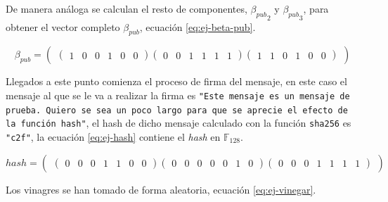 De manera análoga se calculan el resto de componentes, ${\beta_{pub}}_2$ y ${\beta_{pub}}_3$, para obtener el vector completo $\beta_{pub}$, ecuación \ref{eq:ej-beta-pub}.

\begin{equation}\label{eq:ej-beta-pub}
{\beta_{pub}} = 
	\left(\begin{matrix}
		\left(\begin{smallmatrix}
			1 & 0 & 0 & 1 & 0 & 0
		\end{smallmatrix}\right)
	
		\left(\begin{smallmatrix}
			0 & 0 & 1 & 1 & 1 & 1
		\end{smallmatrix}\right)
	
		\left(\begin{smallmatrix}
			1 & 1 & 0 & 1 & 0 & 0
		\end{smallmatrix}\right)
	\end{matrix}\right)
\end{equation}

Llegados a este punto comienza el proceso de firma del mensaje, en este caso el mensaje al que se le va a realizar la firma es \texttt{"{}Este mensaje es un mensaje de prueba. Quiero se sea un poco largo para que se aprecie el efecto de la función hash"{}}, el hash de dicho mensaje calculado con la función \texttt{sha256} es \texttt{"{}c2f"{}}, la ecuación \ref{eq:ej-hash} contiene el \textit{hash} en $\mathds{F}_{128}$.

\begin{equation}\label{eq:ej-hash}
	{hash} = 
	\left(\begin{matrix}
		\left(\begin{smallmatrix}
			0 & 0 & 0 & 1 & 1 & 0 & 0
		\end{smallmatrix}\right)
		
		\left(\begin{smallmatrix}
			0 & 0 & 0 & 0 & 0 & 1 & 0
		\end{smallmatrix}\right)
		
		\left(\begin{smallmatrix}
			0 & 0 & 0 & 1 & 1 & 1 & 1
		\end{smallmatrix}\right)
	\end{matrix}\right)
\end{equation}

Los vinagres se han tomado de forma aleatoria, ecuación \ref{eq:ej-vinegar}. 

